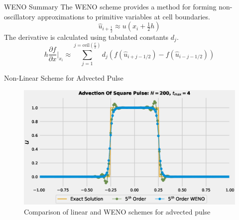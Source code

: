 \documentclass[10pt]{beamer}
\begin{document}

\begin{frame}{WENO Summary}
  The WENO scheme provides a method for forming non-oscillatory approximations to primitive variables at cell boundaries.
  $$
  \hat{u}_{i+\frac{1}{2}} \approx u(x_{i}+\tfrac{1}{2}h)
  $$
  The derivative is calculated using tabulated constants $d_j$.
  $$	h\frac{\partial f}{\partial x}\bigg|_{x_i}\approx \sum_{j=1}^{j=\text{ceil}(\tfrac{r}{2})}d_j(f(\hat{u}_{i+j-1/2})-f(\hat{u}_{i-j-1/2}))$$
\end{frame}

\begin{frame}{Non-Linear Scheme for Advected Pulse}
  \begin{figure}[H]
    \centering
    \includegraphics[scale=0.475]{AdvectionHighOrderComparison_pulseWENO.eps}\caption{Comparison of linear and WENO schemes for advected pulse}
    \end{figure}
\end{frame}
\end{document}
